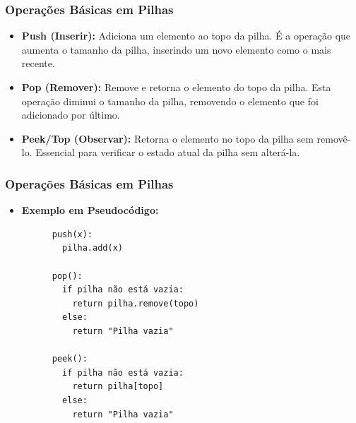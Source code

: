 \begin{frame}[fragile]
  \frametitle{Operações Básicas em Pilhas}
  \begin{itemize}
    \item \textbf{Push (Inserir):} Adiciona um elemento ao topo da pilha. É a operação que aumenta o tamanho da pilha, inserindo um novo elemento como o mais recente.
    \item \textbf{Pop (Remover):} Remove e retorna o elemento do topo da pilha. Esta operação diminui o tamanho da pilha, removendo o elemento que foi adicionado por último.
    \item \textbf{Peek/Top (Observar):} Retorna o elemento no topo da pilha sem removê-lo. Essencial para verificar o estado atual da pilha sem alterá-la.
  \end{itemize}
\end{frame}

\begin{frame}[fragile]
  \frametitle{Operações Básicas em Pilhas}
  \begin{itemize}
    \item \textbf{Exemplo em Pseudocódigo:}
    \small
    \begin{verbatim}
      push(x):
        pilha.add(x)

      pop():
        if pilha não está vazia:
          return pilha.remove(topo)
        else:
          return "Pilha vazia"

      peek():
        if pilha não está vazia:
          return pilha[topo]
        else:
          return "Pilha vazia"
      \end{verbatim}
  \end{itemize}
\end{frame}


